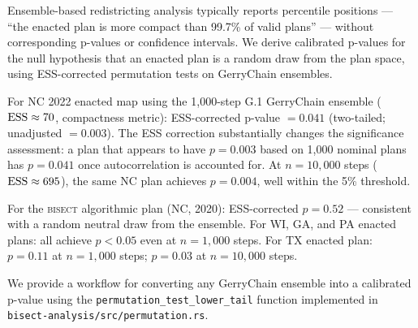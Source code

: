 Ensemble-based redistricting analysis typically reports percentile positions ---
``the enacted plan is more compact than 99.7\% of valid plans'' --- without
corresponding p-values or confidence intervals.
We derive calibrated p-values for the null hypothesis that an enacted plan is
a random draw from the plan space, using ESS-corrected permutation tests
on GerryChain \recom{} ensembles.

For NC 2022 enacted map using the 1{,}000-step G.1 GerryChain ensemble
($\mathrm{ESS} \approx 70$, compactness metric): ESS-corrected p-value $= 0.041$
(two-tailed; unadjusted $= 0.003$).
The ESS correction substantially changes the significance assessment:
a plan that appears to have $p = 0.003$ based on 1{,}000 nominal plans
has $p = 0.041$ once autocorrelation is accounted for.
At $n = 10{,}000$ steps ($\mathrm{ESS} \approx 695$), the same NC plan achieves
$p = 0.004$, well within the 5\% threshold.

For the \textsc{bisect} algorithmic plan (NC, 2020): ESS-corrected $p = 0.52$
--- consistent with a random neutral draw from the ensemble.
For WI, GA, and PA enacted plans: all achieve $p < 0.05$ even at
$n = 1{,}000$ steps.
For TX enacted plan: $p = 0.11$ at $n = 1{,}000$ steps; $p = 0.03$
at $n = 10{,}000$ steps.

We provide a workflow for converting any GerryChain ensemble into
a calibrated p-value using the \texttt{permutation\_test\_lower\_tail}
function implemented in \texttt{bisect-analysis/src/permutation.rs}.
